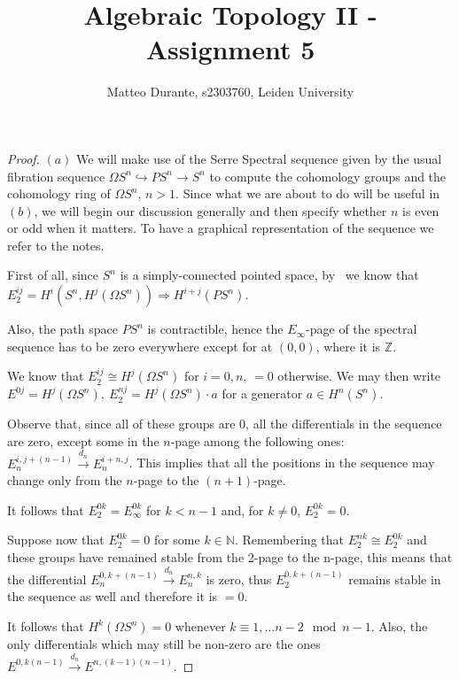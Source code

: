 \documentclass{article}
\newcommand{\numberset}{\mathbb}
\newcommand{\N}{\numberset{N}}
\newcommand{\Z}{\numberset{Z}}
\newcommand{\exercise}[1]{\noindent {\bf Exercise #1}}
\begin{document}
\title{Algebraic Topology II - Assignment 5}

\author{Matteo Durante, s2303760, Leiden University}

\maketitle

\exercise{2}

\begin{proof}
    $(a)$ We will make use of the Serre Spectral sequence given by the usual
    fibration sequence $\Omega S^n\hookrightarrow PS^n\rightarrow S^n$ to
    compute the cohomology groups and the cohomology ring of $\Omega S^n$,
    $n>1$. Since what we are about to do will be useful in $(b)$, we will begin
    our discussion generally and then specify whether $n$ is even or odd when it
    matters. To have a graphical representation of the sequence we refer to the
    notes.

    First of all, since $S^n$ is a simply-connected pointed space, by~\cite[thm.
    9.5]{HM19} we know that $E^{ij}_2=H^i(S^n,H^j(\Omega S^n))\Rightarrow
    H^{i+j}(PS^n)$.

    Also, the path space $PS^n$ is contractible, hence the $E_\infty$-page of
    the spectral sequence has to be zero everywhere except for at $(0,0)$, where
    it is $\Z$.

    We know that $E^{ij}_2\cong H^j(\Omega S^n)$ for $i=0,n$, $=0$ otherwise. We
    may then write $E^{0j}=H^j(\Omega S^n),\ E^{nj}_2=H^j(\Omega S^n)\cdot a$
    for a generator $a\in H^n(S^n)$.

    Observe that, since all of these groups are 0, all the differentials in the
    sequence are zero, except some in the $n$-page among the following ones:
    $E^{i,j+(n-1)}_n\xrightarrow{d_n}E^{i+n,j}_n$. This implies that all the
    positions in the sequence may change only from the $n$-page to the
    $(n+1)$-page.

    It follows that $E^{0k}_2=E^{0k}_\infty$ for $k<n-1$ and, for $k\neq 0$,
    $E^{0k}_2=0$.

    Suppose now that $E^{0k}_2=0$ for some $k\in\N$. Remembering that
    $E^{nk}_2\cong E^{0k}_2$ and these groups have remained stable from the
    2-page to the n-page, this means that the differential $E^{0,k+(n-1)}_n
    \xrightarrow{d_n} E^{n,k}_n$ is zero, thus $E^{0,k+(n-1)}_2$ remains stable
    in the sequence as well and therefore it is $=0$.

    It follows that $H^k(\Omega S^n)=0$ whenever $k\equiv1,\ldots n-2\mod n-1$.
    Also, the only differentials which may still be non-zero are the ones
    $E^{0,k(n-1)}\xrightarrow{d_n}E^{n,(k-1)(n-1)}$.


\end{proof}
\end{document}
